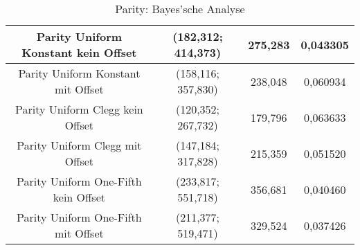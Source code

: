 \begin{table}[H]
\begin{tabular}{c | c | c | c}
		\hline
		\hline
		Parity Uniform Konstant kein Offset & (182,312; 414,373) & 275,283 & 0,043305\\
		\hline
		Parity Uniform Konstant mit Offset & (158,116; 357,830) & 238,048 & 0,060934\\
		\hline
		Parity Uniform Clegg kein Offset & (120,352; 267,732) & 179,796 & 0,063633\\
		\hline
		Parity Uniform Clegg mit Offset & (147,184; 317,828) & 215,359 & 0,051520\\
		\hline
		Parity Uniform One-Fifth kein Offset & \color{red}(233,817; 551,718)\color{black} & 356,681 & \color{red}0,040460\color{black}\\
		\hline
		Parity Uniform One-Fifth mit Offset & (211,377; 519,471) & 329,524 & \color{red}0,037426\color{black}\\
	\end{tabular}
	\caption{Parity: Bayes'sche Analyse}
	\label{table:parityBayesian}
\end{table}
